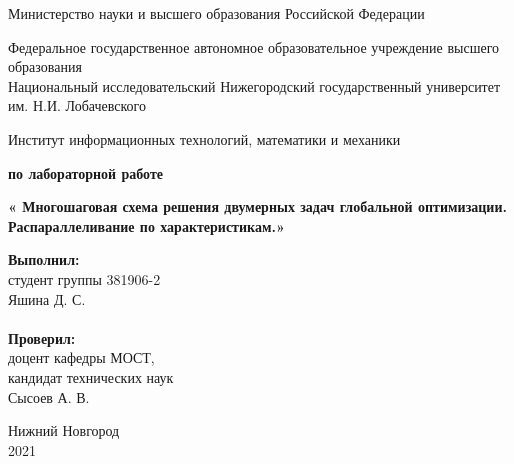 \documentclass{report}
\begin{document}
\begin{titlepage}

\begin{center}
Министерство науки и высшего образования Российской Федерации
\end{center}

\begin{center}
Федеральное государственное автономное образовательное учреждение высшего образования \\
Национальный исследовательский Нижегородский государственный университет им. Н.И. Лобачевского
\end{center}

\begin{center}
Институт информационных технологий, математики и механики
\end{center}

\vspace{4em}

\begin{center}
\textbf{ по лабораторной работе} \\
\end{center}
\begin{center}
\textbf{\Large« Многошаговая схема решения двумерных задач глобальной оптимизации. Распараллеливание по характеристикам.»} \\
\end{center}

\vspace{4em}

\newbox{\lbox}
\newlength{\maxl}
\setlength{\maxl}{\wd\lbox}
\hfill\parbox{7cm}{
\hspace*{5cm}\hspace*{-5cm}\textbf{Выполнил:} \\ студент группы 381906-2 \\ Яшина Д. С.\\
\\
\hspace*{5cm}\hspace*{-5cm}\textbf{Проверил:}\\ доцент кафедры МОСТ, \\ кандидат технических наук \\ Сысоев А. В.\\
}
\vspace{\fill}

\begin{center} Нижний Новгород \\ 2021 \end{center}

\end{titlepage}
\end{document}
